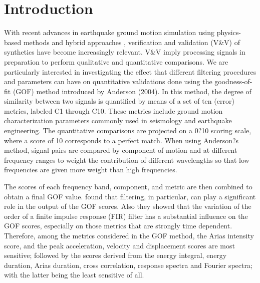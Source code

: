 
\section{Introduction}

With recent advances in earthquake ground motion simulation using physics-based methods and hybrid approaches \citep[e.g.,][]{Bielak_2010_GJI, Graves_2010}, verification and validation (V\&V) of synthetics have become increasingly relevant. V\&V imply processing signals in preparation to perform qualitative and quantitative comparisons. We are particularly interested in investigating the effect that different filtering procedures and parameters can have on quantitative validations done using the goodness-of-fit (GOF) method introduced by Anderson (2004). In this method, the degree of similarity between two signals is quantified by means of a set of ten (error) metrics, labeled C1 through C10. These metrics include ground motion characterization parameters commonly used in seismology and earthquake engineering. The quantitative comparisons are projected on a 0?10 scoring scale, where a score of 10 corresponds to a perfect match. When using Anderson?s method, signal pairs are compared by component of motion and at different frequency ranges to weight the contribution of different wavelengths so that low frequencies are given more weight than high frequencies.

The scores of each frequency band, component, and metric are then combined to obtain a final GOF value. \citet{Khoshnevis_2015} found that filtering, in particular, can play a significant role in the output of the GOF scores. Also they showed that the variation of the order of a finite impulse response (FIR) filter has a substantial influence on the GOF scores, especially on those metrics that are strongly time dependent. Therefore, among the metrics considered in the GOF method, the Arias intensity score, and the peak acceleration, velocity and displacement scores are most sensitive; followed by the scores derived from the energy integral, energy duration, Arias duration, cross correlation, response spectra and Fourier spectra; with the latter being the least sensitive of all.

